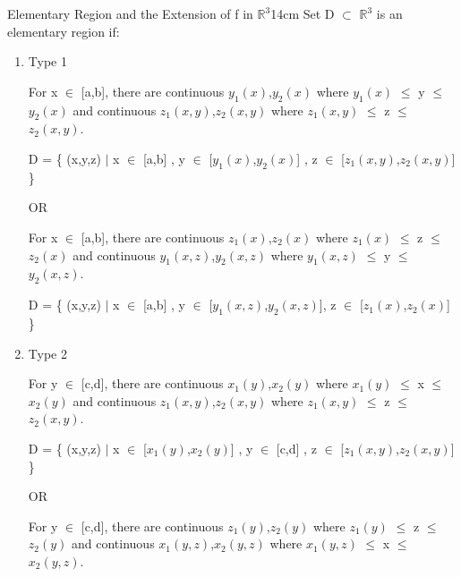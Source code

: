     \begin{definition}{Elementary Region and the Extension of f
    in $\mathbb{R}^3$}{14cm}
        Set D $\subset$ $\mathbb{R}^3$ is an elementary region if:

        \begin{enumerate}[label=(\alph*), leftmargin=1cm, itemsep=0.1cm]
            \item {\color{red} Type 1}

                For x $\in$ [a,b], there are continuous $y_1(x)$,$y_2(x)$ where
                $y_1(x)$ $\leq$ y $\leq$ $y_2(x)$
                and continuous $z_1(x,y)$,$z_2(x,y)$ where
                $z_1(x,y)$ $\leq$ z $\leq$ $z_2(x,y)$.

                \hspace{0.5cm}
                D = \{ (x,y,z) $|$ x $\in$ [a,b] , y $\in$ [$y_1(x)$,$y_2(x)$] ,
                                z $\in$ [$z_1(x,y)$,$z_2(x,y)$] \}

                OR

                For x $\in$ [a,b], there are continuous $z_1(x)$,$z_2(x)$ where
                $z_1(x)$ $\leq$ z $\leq$ $z_2(x)$
                and continuous $y_1(x,z)$,$y_2(x,z)$ where
                $y_1(x,z)$ $\leq$ y $\leq$ $y_2(x,z)$.

                \hspace{0.5cm}
                D = \{ (x,y,z) $|$ x $\in$ [a,b] , y $\in$ [$y_1(x,z)$,$y_2(x,z)$],
                                    z $\in$ [$z_1(x)$,$z_2(x)$] \}

            \item {\color{red} Type 2}

                For y $\in$ [c,d], there are continuous $x_1(y)$,$x_2(y)$ where
                $x_1(y)$ $\leq$ x $\leq$ $x_2(y)$
                and continuous $z_1(x,y)$,$z_2(x,y)$ where
                $z_1(x,y)$ $\leq$ z $\leq$ $z_2(x,y)$.

                \hspace{0.5cm}
                D = \{ (x,y,z) $|$ x $\in$ [$x_1(y)$,$x_2(y)$] , y $\in$ [c,d] ,
                                z $\in$ [$z_1(x,y)$,$z_2(x,y)$] \}

                OR

                For y $\in$ [c,d], there are continuous $z_1(y)$,$z_2(y)$ where
                $z_1(y)$ $\leq$ z $\leq$ $z_2(y)$
                and continuous $x_1(y,z)$,$x_2(y,z)$ where
                $x_1(y,z)$ $\leq$ x $\leq$ $x_2(y,z)$.


\end{enumerate}
\end{definition}
